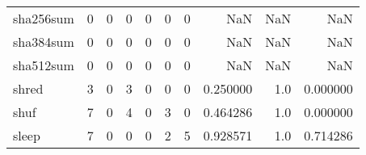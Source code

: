 \begin{tabular}{lrrrrrrrrr}
sha256sum &                                                  0 &                                                  0 &                                                  0 &                                                  0 &                                                  0 &                                                  0 &                                                NaN &                                    NaN &                                  NaN \\
sha384sum &                                                  0 &                                                  0 &                                                  0 &                                                  0 &                                                  0 &                                                  0 &                                                NaN &                                    NaN &                                  NaN \\
sha512sum &                                                  0 &                                                  0 &                                                  0 &                                                  0 &                                                  0 &                                                  0 &                                                NaN &                                    NaN &                                  NaN \\
shred     &                                                  3 &                                                  0 &                                                  3 &                                                  0 &                                                  0 &                                                  0 &                                           0.250000 &                                    1.0 &                             0.000000 \\
shuf      &                                                  7 &                                                  0 &                                                  4 &                                                  0 &                                                  3 &                                                  0 &                                           0.464286 &                                    1.0 &                             0.000000 \\
sleep     &                                                  7 &                                                  0 &                                                  0 &                                                  0 &                                                  2 &                                                  5 &                                           0.928571 &                                    1.0 &                             0.714286 \\

\end{tabular}
